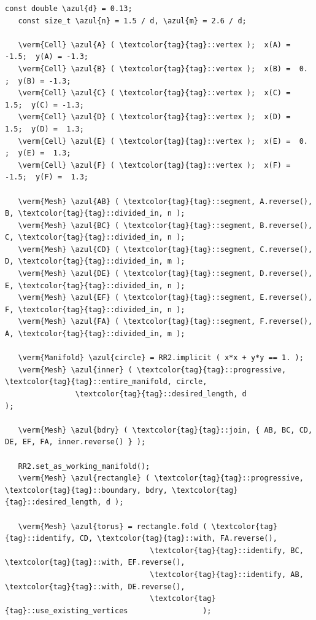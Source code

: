 \begin{Verbatim}[commandchars=\\\{\},formatcom=\small\tt,frame=single,
   label=parag-\ref{\numb section 7.\numb parag 15}.cpp,rulecolor=\color{coment},
   baselinestretch=0.94,framesep=2mm                                             ]
   const double \azul{d} = 0.13;
   const size_t \azul{n} = 1.5 / d, \azul{m} = 2.6 / d;

   \verm{Cell} \azul{A} ( \textcolor{tag}{tag}::vertex );  x(A) = -1.5;  y(A) = -1.3;
   \verm{Cell} \azul{B} ( \textcolor{tag}{tag}::vertex );  x(B) =  0. ;  y(B) = -1.3;
   \verm{Cell} \azul{C} ( \textcolor{tag}{tag}::vertex );  x(C) =  1.5;  y(C) = -1.3;
   \verm{Cell} \azul{D} ( \textcolor{tag}{tag}::vertex );  x(D) =  1.5;  y(D) =  1.3;
   \verm{Cell} \azul{E} ( \textcolor{tag}{tag}::vertex );  x(E) =  0. ;  y(E) =  1.3;
   \verm{Cell} \azul{F} ( \textcolor{tag}{tag}::vertex );  x(F) = -1.5;  y(F) =  1.3;

   \verm{Mesh} \azul{AB} ( \textcolor{tag}{tag}::segment, A.reverse(), B, \textcolor{tag}{tag}::divided_in, n );
   \verm{Mesh} \azul{BC} ( \textcolor{tag}{tag}::segment, B.reverse(), C, \textcolor{tag}{tag}::divided_in, n );
   \verm{Mesh} \azul{CD} ( \textcolor{tag}{tag}::segment, C.reverse(), D, \textcolor{tag}{tag}::divided_in, m );
   \verm{Mesh} \azul{DE} ( \textcolor{tag}{tag}::segment, D.reverse(), E, \textcolor{tag}{tag}::divided_in, n );
   \verm{Mesh} \azul{EF} ( \textcolor{tag}{tag}::segment, E.reverse(), F, \textcolor{tag}{tag}::divided_in, n );
   \verm{Mesh} \azul{FA} ( \textcolor{tag}{tag}::segment, F.reverse(), A, \textcolor{tag}{tag}::divided_in, m );

   \verm{Manifold} \azul{circle} = RR2.implicit ( x*x + y*y == 1. );
   \verm{Mesh} \azul{inner} ( \textcolor{tag}{tag}::progressive, \textcolor{tag}{tag}::entire_manifold, circle,
                \textcolor{tag}{tag}::desired_length, d                         );

   \verm{Mesh} \azul{bdry} ( \textcolor{tag}{tag}::join, { AB, BC, CD, DE, EF, FA, inner.reverse() } );

   RR2.set_as_working_manifold();
   \verm{Mesh} \azul{rectangle} ( \textcolor{tag}{tag}::progressive, \textcolor{tag}{tag}::boundary, bdry, \textcolor{tag}{tag}::desired_length, d );

   \verm{Mesh} \azul{torus} = rectangle.fold ( \textcolor{tag}{tag}::identify, CD, \textcolor{tag}{tag}::with, FA.reverse(),
                                 \textcolor{tag}{tag}::identify, BC, \textcolor{tag}{tag}::with, EF.reverse(),
                                 \textcolor{tag}{tag}::identify, AB, \textcolor{tag}{tag}::with, DE.reverse(),
                                 \textcolor{tag}{tag}::use_existing_vertices                 );
\end{Verbatim}

